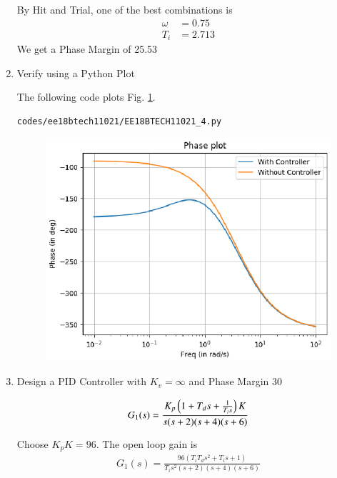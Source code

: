\begin{enumerate}[label=\thesubsection.\arabic*.,ref=\thesubsection.\theenumi]
By Hit and Trial, one of the best combinations is
\begin{align}
    \omega &= 0.75
\\
    T_{i} &= 2.713
\end{align}
We get a Phase Margin of 25.53\degree

\item
Verify using a Python Plot

\solution The following code plots Fig. \ref{fig:ee18btech11021_pi}.

\begin{lstlisting}
codes/ee18btech11021/EE18BTECH11021_4.py
\end{lstlisting}

\begin{figure}[!ht]
\centering
\includegraphics[width=\columnwidth]{./figs/ee18btech11021/EE18BTECH11021_PI.eps}
\caption{}
\label{fig:ee18btech11021_pi}
\end{figure}

\item
Design a PID Controller with $K_{v} = \infty$ and Phase Margin 30\degree

\solution

\begin{align}
    G_{1}(s) = \frac{K_{p}\left(1 + T_{d}s + \frac{1}{T_{i}s}\right)K}{s(s+2)(s+4)(s+6)}
\end{align}

Choose $K_{p}K = 96$.  The open loop gain is
\begin{align}
    G_{1}(s) = \frac{96(T_{i}T_{d}s^2 + T_{i}s +  1)}{T_{i}s^2(s+2)(s+4)(s+6)}
\end{align}


\end{enumerate}
